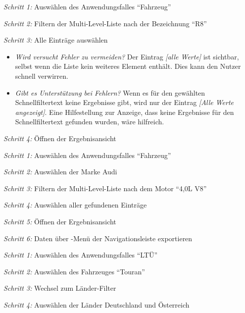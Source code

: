 \textit{Schritt 1:} Auswählen des Anwendungsfalles \enquote{Fahrzeug}\par
\textit{Schritt 2:} Filtern der Multi-Level-Liste nach der Bezeichnung \enquote{R8}\par
\textit{Schritt 3:} Alle Einträge auswählen\par
\begin{itemize}
 \item \textit{Wird versucht Fehler zu vermeiden?} Der Eintrag \textit{[alle Werte]} ist sichtbar, selbst wenn die Liste kein weiteres Element enthält. Dies kann den Nutzer schnell verwirren.\par
 \item \textit{Gibt es Unterstützung bei Fehlern?} Wenn es für den gewählten Schnellfiltertext keine Ergebnisse gibt, wird nur der Eintrag \textit{[Alle Werte angezeigt]}. Eine Hilfestellung zur Anzeige, dass keine Ergebnisse für den Schnellfiltertext gefunden wurden, wäre hilfreich.\par
\end{itemize}
\textit{Schritt 4:} Öffnen der Ergebnisansicht\par
{}\par
\textit{Schritt 1:} Auswählen des Anwendungsfalles \enquote{Fahrzeug}\par
\textit{Schritt 2:} Auswählen der Marke Audi\par
\textit{Schritt 3:} Filtern der Multi-Level-Liste nach dem Motor \enquote{4,0L V8}\par
\textit{Schritt 4:} Auswählen aller gefundenen Einträge\par
\textit{Schritt 5:} Öffnen der Ergebnisansicht\par
\textit{Schritt 6:} Daten über -Menü der Navigationsleiste exportieren\par
{}\par
\textit{Schritt 1:} Auswählen des Anwendungsfalles \enquote{LTÜ}\par
\textit{Schritt 2:} Auswählen des Fahrzeuges \enquote{Touran}\par
\textit{Schritt 3:} Wechsel zum Länder-Filter\par
\textit{Schritt 4:} Auswählen der Länder Deutschland und Österreich\par
